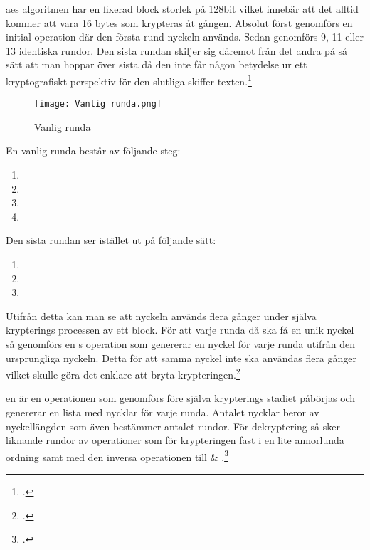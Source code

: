 \acrshort{aes} algoritmen har en fixerad block storlek på 128bit vilket innebär att
det alltid kommer att vara 16 \glspl{byte} som krypteras åt gången. Absolut först genomförs
en initial  operation där den första rund nyckeln används.
Sedan genomförs 9, 11 eller 13 identiska rundor. Den sista rundan skiljer sig däremot från det andra
på så sätt att man hoppar över sista  då den inte får någon betydelse ur ett
kryptografiskt perspektiv för den slutliga skiffer texten.\footcite{daemen1999aes}

\begin{wrapfigure}{r}{0.5\textwidth}
    \centering
    \texttt{[image: Vanlig runda.png]}
    \caption{Vanlig runda}
    \label{fig:round-function}
\end{wrapfigure}

En vanlig runda består av följande steg:

\begin{enumerate}
    \item {}
    \item {}
    \item {}
    \item {}
\end{enumerate}

Den sista rundan ser istället ut på följande sätt:

\begin{enumerate}
    \item {}
    \item {}
    \item {}
\end{enumerate}

Utifrån detta kan man se att nyckeln används flera gånger under själva krypterings processen av ett block.
För att varje runda då ska få en unik nyckel så genomförs en s operation
som genererar en nyckel för varje runda utifrån den ursprungliga nyckeln. Detta för att samma nyckel
inte ska användas flera gånger vilket skulle göra det enklare att bryta krypteringen.\footcite{daemen1999aes}

en är en operationen som genomförs före själva krypterings stadiet påbörjas
och genererar en lista med nycklar för varje runda. Antalet nycklar beror av nyckellängden som även bestämmer antalet rundor.
För dekryptering så sker liknande rundor av operationer som för krypteringen fast
i en lite annorlunda ordning samt med den inversa operationen till  \& .\footcite{daemen1999aes}

